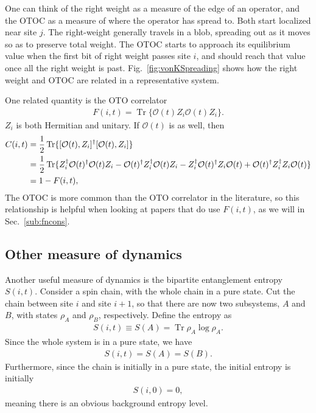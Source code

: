 \documentclass[a4paper,11pt]{article}
\renewcommand{\cal}{\mathcal}
\newcommand{\half}{\frac{1}{2}}
\newcommand{\nn}{\nonumber\\}
\DeclareMathOperator{\Tr}{Tr}
\let\Re\relax
\DeclareMathOperator{\Re}{Re}
\begin{document}
One can think of the right weight as a measure of the edge of an operator, and the OTOC as a measure of where the operator has spread to. Both start localized near site $j$. The right-weight generally travels in a blob, spreading out as it moves so as to preserve total weight. The OTOC starts to approach its equilibrium value when the first bit of right weight passes site $i$, and should reach that value once all the right weight is past.
Fig.~\ref{fig:vonKSpreading} shows how the right weight and OTOC are related in a representative system.

One related quantity is the OTO correlator 
\begin{align}
F(i,t) = \Tr\{\cal{O}(t) Z_i\cal{O}(t) Z_i\}.
\end{align}
$Z_i$ is both Hermitian and unitary. If $\cal{O}(t)$ is as well, then
\begin{align}
C(i,t) &= \half \Tr \{[\cal{O}(t), Z_i]^\dag [\cal{O}(t), Z_i] \}\nn
&= \half \Tr\{Z_i^\dag \cal{O}(t)^\dag \cal{O}(t) Z_i - \cal{O}(t)^\dag Z_i^\dag \cal{O}(t) Z_i - Z_i^\dag \cal{O}(t)^\dag Z_i \cal{O}(t) + \cal{O}(t)^\dag Z_i^\dag Z_i \cal{O}(t) \} \nn
&= 1-\Re F(i,t), \label{eqn:OTOCOTO}
\end{align}
The OTOC is more common than the OTO correlator in the literature, so this relationship is helpful when looking at papers that do use $F(i,t)$, as we will in Sec.~\ref{sub:fncons}.

\subsection{Other measure of dynamics} \label{sub:other}

Another useful measure of dynamics is the bipartite entanglement entropy $S(i,t)$. Consider a spin chain, with the whole chain in a pure state. Cut the chain between site $i$ and site $i+1$, so that there are now two subsystems, $A$ and $B$, with states $\rho_A$ and $\rho_B$, respectively. Define the entropy as 
\begin{align}
S(i,t) \equiv S(A) = \Tr\rho_A\log\rho_A.
\end{align}
Since the whole system is in a pure state, we have
\begin{align}
S(i,t)=S(A)=S(B).
\end{align}
Furthermore, since the chain is initially in a pure state, the initial entropy is initially
\begin{align}
S(i,0)= 0,
\end{align}
meaning there is an obvious background entropy level.
\end{document}
